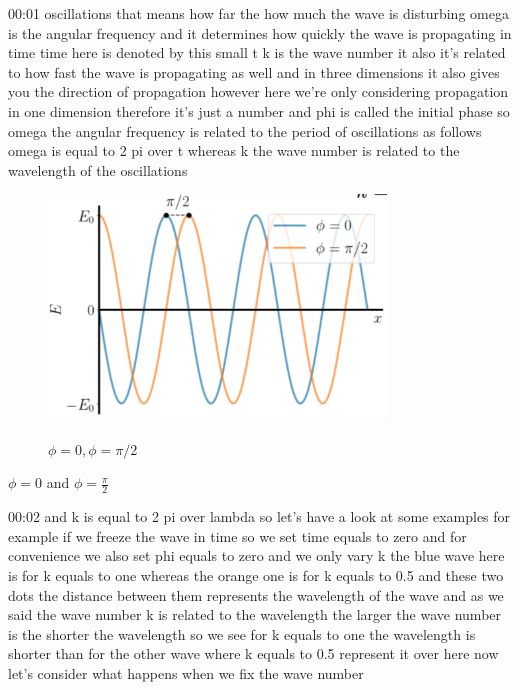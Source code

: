 00:01
oscillations that means how far the how much the wave is disturbing
omega is the angular frequency and it determines
how quickly the wave is propagating in time time here is denoted by this small t
k is the wave number it also it's related to
how fast the wave is propagating as well and in three dimensions it also
gives you the direction of propagation however here we're only considering
propagation in one dimension therefore it's just a number
and phi is called the initial phase so omega the angular frequency is
related to the period of oscillations as follows omega is equal to 2 pi over t
whereas k the wave number is related to the wavelength of the oscillations
\begin{figure}[H]
   \centering
    \includegraphics[width=0.8\textwidth]{lesson6/phi.pdf}
    \label{fig: 1}
    \begin{center}
        \caption{$\phi = 0, \phi = \pi / 2$}
    \end{center}
\end{figure}

$\phi = 0$ and $\phi = \frac{\pi}{2}$

00:02
and k is equal to 2 pi over lambda so let's have a look at some examples
for example if we freeze the wave in time so we set
time equals to zero and for convenience we also set phi
equals to zero and we only vary k the blue wave here is for k
equals to one whereas the orange one is for k equals to 0.5
and these two dots the distance between them
represents the wavelength of the wave and as we said the wave number k
is related to the wavelength the larger the wave number is the shorter the
wavelength so we see for k equals to one the wavelength is shorter
than for the other wave where k equals to 0.5 represent it over here
now let's consider what happens when we fix the wave number

